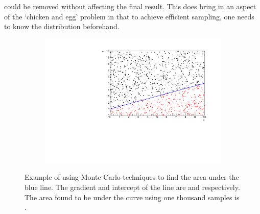  could be removed without affecting the final result. This does bring in an aspect of the `chicken and egg' problem in that to achieve efficient sampling, one needs to know the distribution beforehand.

\begin{figure}[h]
  \begin{subfigure}[t]{0.80\textwidth}
    \includegraphics[width=\textwidth, trim={0mm 0mm 0mm 0mm}, clip,page=1]{Figures/MCMC/MCTechnique.pdf}
  \end{subfigure}
  \caption{Example of using Monte Carlo techniques to find the area under the blue line. The gradient and intercept of the line are  and  respectively. The area found to be under the curve using one thousand samples is .}
  \label{fig:MCMC_MCTechnique}
\end{figure}

